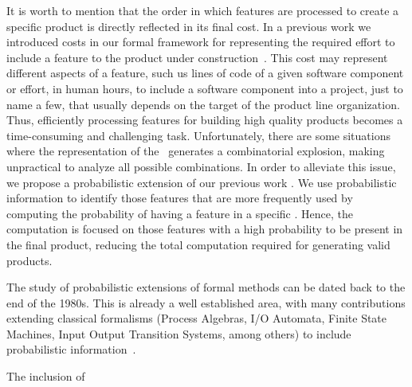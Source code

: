 It is worth to mention that the order in which features are processed to create a specific product is directly reflected in its final cost. In a previous work we introduced costs in our formal framework for representing the required effort to include a feature to the product under construction~\cite{cln16}. This cost may represent different aspects of a feature, such us lines of code of a given software component or effort, in human hours, to include a software component into a project, just to name a few, that usually depends on the target of the product line organization. Thus, efficiently processing features for building high quality products becomes a time-consuming and challenging task. Unfortunately, there are some situations where the representation of the \SPL\ generates a combinatorial explosion, making unpractical to analyze all possible combinations.
%
In order to alleviate this issue, we propose a probabilistic extension of our previous work \fodaPA. We use probabilistic information to identify those features that are more frequently used by computing the probability of having a feature in a specific \SPL. Hence, the computation is focused on those features with a high probability to be present in the final product, reducing the total computation required for generating valid products.




The study of probabilistic extensions of formal methods can be dated back to the end of the 1980s. This is already a well established area, with many contributions extending classical formalisms (Process Algebras, I/O Automata, Finite State Machines, Input Output Transition Systems, among others) to include probabilistic information~\cite{ls91,rgs95,cdsy99,nun03,lnr06,csv07,dghm08,hm09,hn10,dghm14,gs16}.
%
%











The inclusion of 


